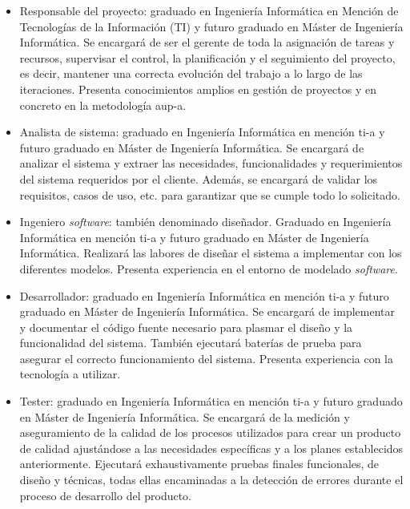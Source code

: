 \documentclass[12pt,a4paper, twoside]{report}
\begin{document}
	\begin{itemize}
		\item Responsable del proyecto: graduado en Ingeniería Informática en Mención de Tecnologías de la Información (TI) y futuro graduado en Máster de Ingeniería Informática. Se encargará de ser el gerente de toda la asignación de tareas y recursos, supervisar el control, la planificación y el seguimiento del proyecto, es decir, mantener una correcta evolución del trabajo a lo largo de las iteraciones. Presenta conocimientos amplios en gestión de proyectos y en concreto en la metodología \gls{aup-a}.
		
		\item Analista de sistema: graduado en Ingeniería Informática en mención \gls{ti-a} y futuro graduado en Máster de Ingeniería Informática. Se encargará de analizar el sistema y extraer las necesidades, funcionalidades y requerimientos del sistema requeridos por el cliente. Además, se encargará de validar los requisitos, casos de uso, etc. para garantizar que se cumple todo lo solicitado.
		
		\item Ingeniero \textit{software}: también denominado diseñador. Graduado en Ingeniería Informática en mención \gls{ti-a} y futuro graduado en Máster de Ingeniería Informática. Realizará las labores de diseñar el sistema a implementar con los diferentes modelos. Presenta experiencia en el entorno de modelado \textit{software}.
		
		\item Desarrollador: graduado en Ingeniería Informática en mención \gls{ti-a} y futuro graduado en Máster de Ingeniería Informática. Se encargará de implementar y documentar el código fuente necesario para plasmar el diseño y la funcionalidad del sistema. También ejecutará baterías de prueba para asegurar el correcto funcionamiento del sistema. Presenta experiencia con la tecnología a utilizar.
		
		\item Tester: graduado en Ingeniería Informática en mención \gls{ti-a} y futuro graduado en Máster de Ingeniería Informática. Se encargará de la medición y aseguramiento de la calidad de los procesos utilizados para crear un producto de calidad ajustándose a las necesidades específicas y a los planes establecidos anteriormente. Ejecutará exhaustivamente pruebas finales funcionales, de diseño y técnicas, todas ellas encaminadas a la detección de errores durante el proceso de desarrollo del producto.		
	\end{itemize}
		
\end{document}
